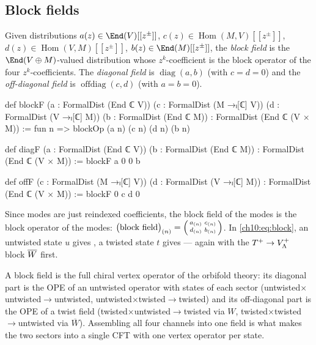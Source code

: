 \subsection{Block fields}

\begin{definition}\label{ch10:def:blockF}
Given distributions $a(z)\in\End(V)[[z^{\pm}]]$, $c(z)\in\operatorname{Hom}(M,V)[[z^{\pm}]]$,
$d(z)\in\operatorname{Hom}(V,M)[[z^{\pm}]]$, $b(z)\in\End(M)[[z^{\pm}]]$, the \emph{block field}
is the $\End(V\oplus M)$-valued distribution whose $z^k$-coefficient is the block operator of the
four $z^k$-coefficients.  The \emph{diagonal field} is $\operatorname{diag}(a,b)$ (with $c=d=0$)
and the \emph{off-diagonal field} is $\operatorname{offdiag}(c,d)$ (with $a=b=0$).
\end{definition}
\begin{leancode}
def blockF (a : FormalDist (End ℂ V)) (c : FormalDist (M →ₗ[ℂ] V)) (d : FormalDist (V →ₗ[ℂ] M))
    (b : FormalDist (End ℂ M)) : FormalDist (End ℂ (V × M)) :=
  fun n => blockOp (a n) (c n) (d n) (b n)

def diagF (a : FormalDist (End ℂ V)) (b : FormalDist (End ℂ M)) : FormalDist (End ℂ (V × M)) :=
  blockF a 0 0 b

def offF (c : FormalDist (M →ₗ[ℂ] V)) (d : FormalDist (V →ₗ[ℂ] M)) :
    FormalDist (End ℂ (V × M)) :=
  blockF 0 c d 0
\end{leancode}
\begin{dictionary}
Since modes are just reindexed coefficients, the block field of the modes is the block operator
of the modes: $\bigl(\text{block field}\bigr)_{(n)}=\begin{psmallmatrix}a_{(n)}&c_{(n)}\\
d_{(n)}&b_{(n)}\end{psmallmatrix}$.  In \eqref{ch10:eq:block}, an untwisted state $u$ gives
, a twisted state $t$ gives  --- again with the
$T^{+}\to V_{\Lambda}^{+}$ block $\overline{W}$ first.
\end{dictionary}

\begin{physics}
A block field is the full chiral vertex operator of the orbifold theory: its diagonal part is the OPE of an untwisted operator with states of each sector (untwisted$\times$untwisted$\to$untwisted, untwisted$\times$twisted$\to$twisted) and its off-diagonal part is the OPE of a twist field (twisted$\times$untwisted$\to$twisted via $W$, twisted$\times$twisted$\to$untwisted via $\overline W$). Assembling all four channels into one field is what makes the two sectors into a single CFT with one vertex operator per state.
\end{physics}

